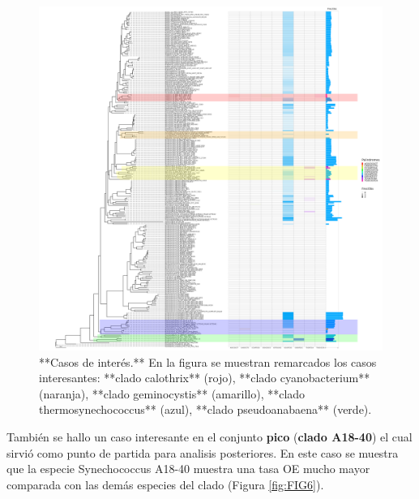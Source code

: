 \documentclass[
]{book}
\begin{document}
\begin{figure}

{\centering \includegraphics[width=75in]{figures/refseq_chr_269_Octanuc_FrecObs_sel256_filogenia_HIG_cases} 

}

\caption{**Casos de interés.** En la figura se muestran remarcados los casos interesantes: **clado calothrix** (rojo), **clado cyanobacterium** (naranja), **clado geminocystis** (amarillo), **clado thermosynechococcus** (azul), **clado pseudoanabaena** (verde).}\label{fig:FIG5}
\end{figure}

También se hallo un caso interesante en el conjunto \textbf{pico} (\textbf{clado A18-40}) el cual sirvió como punto de partida para analisis posteriores. En este caso se muestra que la especie Synechococcus A18-40 muestra una tasa OE mucho mayor comparada con las demás especies del clado (Figura \ref{fig:FIG6}).
\end{document}
